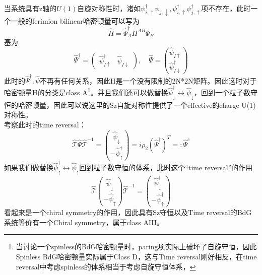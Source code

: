 \documentclass[10pt,openany]{book}
\theoremstyle{thmstyle} %
\theoremstyle{defstyle} %
\theoremstyle{prostyle} %
\begin{document}
当系统具有z轴的$ U(1) $自旋对称性时，诸如$ \psi^{\dagger}_{i,\uparrow}\psi_{j,\downarrow}, \psi^{\dagger}_{i,\uparrow}\psi^{\dagger}_{j,\uparrow}$项不存在，此时一个一般的ferimion bilinear哈密顿量可以写为
\begin{equation}
  \hat{H}=\hat{\Psi}_A^{\dagger} H^{A B} \hat{\Psi}_B
\end{equation}
基为
\begin{equation*}
  \hat{\Psi}^{\dagger}=\left(\begin{array}{cc}
    \hat{\psi}_{I \uparrow}^{\dagger} & \hat{\psi}_{I \downarrow}
    \end{array}\right), \quad \hat{\Psi}=\binom{\hat{\psi}_{I \uparrow}}{\hat{\psi}_{I \downarrow}^{\dagger}}
\end{equation*}   
此时的$ \hat{\Psi}^{\dagger},\hat{\psi} $不再有任何关系，因此H是一个没有限制的2N*2N矩阵。因此这时对于哈密顿量H的分类是class A\footnote{当讨论一个spinless的BdG哈密顿量时，paring项实际上破坏了自旋守恒，因此Spinless BdG哈密顿量实际属于Class D，这与Time reversal刚好相反，在time reversal中考虑spinless的体系相当于考虑自旋守恒体系，}。并且我们还可以做替换$ \hat{\psi}_{\downarrow}^{\dagger} \leftrightarrow \hat{\psi}_{\downarrow} $，回到一个粒子数守恒的哈密顿量，因此可以说这里的Sz自旋对称性提供了一个effective的charge U(1)对称性。\\
考察此时的time reversal：
\begin{equation}
  \hat{\mathscr{T}} \hat{\Psi} \hat{\mathscr{T}}^{-1}=\binom{\hat{\psi}_{\downarrow}}{-\hat{\psi}_{\uparrow}^{\dagger}}=i \rho_2\left(\hat{\Psi}^{\dagger}\right)^T=: \hat{\Psi}^c
\end{equation}
如果我们做替换$ \hat{\psi}_{\uparrow}^{\dagger} \leftrightarrow \hat{\psi}_{\uparrow} $回到粒子数守恒的体系，此时这个“time reversal”的作用
\begin{equation*}
  \hat{\mathscr{T}} \binom{\hat{\psi}_{\downarrow}}{-\hat{\psi}_{\uparrow}} \hat{\mathscr{T}}^{-1}=\binom{\hat{\psi}^{\dagger}_{\downarrow}}{-\hat{\psi}_{\uparrow}^{\dagger}}
\end{equation*}
看起来是一个chiral symmetry的作用，因此具有Sz守恒以及Time reversal的BdG系统等价有一个Chiral symmetry，属于class AIII。
\end{document}
